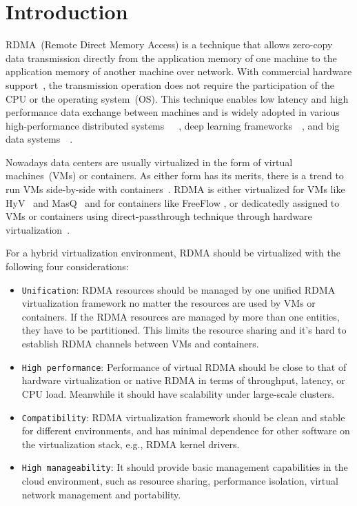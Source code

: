 \section{Introduction}
RDMA~(Remote Direct Memory Access) is a technique that allows zero-copy data transmission directly from the application memory of one machine to the application memory of another machine over network. With commercial hardware support~\cite{roce, iwarp, infiniband}, the transmission operation does not require the participation of the CPU or the operating system~(OS). This technique enables low latency and high performance data exchange between machines and is widely adopted in various high-performance distributed systems~\cite{dragojevic2014farm}~\cite{wei2015fast}~\cite{lu2017octopus}, deep learning frameworks~\cite{abadi2016tensorflow}~\cite{chen2015mxnet}, and big data systems~\cite{spark-rdma}~\cite{hadoop-rdma}.

Nowadays data centers are usually virtualized in the form of virtual machines~(VMs) or containers. As either form has its merits, there is a trend to run VMs side-by-side with containers~\cite{rethinkingvirtualization}. RDMA is either virtualized for VMs like HyV~\cite{pfefferle2015hybrid} and MasQ~\cite{he2020masq} and for containers like FreeFlow \cite{kim2019freeflow}, or dedicatedly assigned to VMs or containers using direct-passthrough technique through hardware virtualization~\cite{sr-iov}.

For a hybrid virtualization environment, RDMA should be virtualized with the following four considerations:

\begin{itemize}
	\item {\verb|Unification|}: RDMA resources should be managed by one unified RDMA virtualization framework no matter the resources are used by VMs or containers. If the RDMA resources are managed by more than one entities, they have to be partitioned. This limits the resource sharing and it's hard to establish RDMA channels between VMs and containers.
	\item {\verb|High performance|}: Performance of virtual RDMA should be close to that of hardware virtualization or native RDMA in terms of throughput, latency, or CPU load. Meanwhile it should have scalability under large-scale clusters.
	\item {\verb|Compatibility|}: RDMA virtualization framework should be clean and stable for different environments, and has minimal dependence for other software on the virtualization stack, e.g., RDMA kernel drivers.
	\item {\verb|High manageability|}: It should provide basic management capabilities in the cloud environment, such as resource sharing, performance isolation, virtual network management and portability.
\end{itemize}


